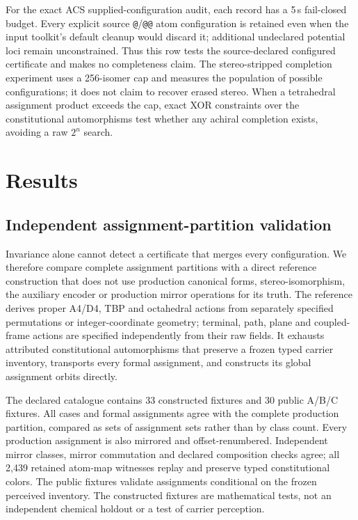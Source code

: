 \documentclass[pdflatex,sn-mathphys-num,referee,lineno]{sn-jnl}
\newcommand{\code}[1]{\texttt{#1}}
\theoremstyle{plain}
\theoremstyle{remark}
\theoremstyle{definition}
\begin{document}
For the exact ACS supplied-configuration audit, each record has a 5\,s
fail-closed budget.  Every explicit source \code{@}/\code{@@} atom
configuration is retained even when the input toolkit's default cleanup would
discard it; additional undeclared potential loci remain unconstrained.  Thus
this row tests the source-declared configured certificate and makes no
completeness claim.  The stereo-stripped completion experiment uses a
256-isomer cap and measures the population of possible configurations; it does
not claim to recover erased stereo.  When a tetrahedral assignment product
exceeds the cap, exact XOR constraints over the constitutional automorphisms
test whether any achiral completion exists, avoiding a raw \(2^n\) search.

\section{Results}
\label{sec:experiments}

\subsection{Independent assignment-partition validation}
\label{sec:independent-orbits}

Invariance alone cannot detect a certificate that merges every configuration.
We therefore compare complete assignment partitions with a direct reference
construction that does not use production canonical forms, stereo-isomorphism,
the auxiliary encoder or production mirror operations for its truth.
The reference derives proper A4/D4, TBP and octahedral actions from separately
specified permutations or integer-coordinate geometry; terminal, path, plane
and coupled-frame actions are specified independently from their raw fields.
It exhausts attributed constitutional automorphisms that preserve a frozen
typed carrier inventory, transports every formal assignment, and constructs
its global assignment orbits directly.

The declared catalogue contains 33 constructed fixtures and 30 public A/B/C
fixtures. All \IndependentCases{} cases and \IndependentAssignments{}
formal assignments agree with the complete production partition, compared as
sets of assignment sets rather than by class count. Every production
assignment is also mirrored and offset-renumbered. Independent mirror classes,
mirror commutation and declared composition checks agree; all 2,439 retained
atom-map witnesses replay and preserve typed constitutional colors.
The public fixtures validate assignments conditional on the frozen perceived
inventory. The constructed fixtures are mathematical tests, not an independent
chemical holdout or a test of carrier perception.
\end{document}
